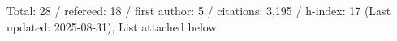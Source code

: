 Total: 28 / refereed: 18 / first author: 5 / citations: 3,195 / h-index: 17 (Last updated: 2025-08-31), List attached below